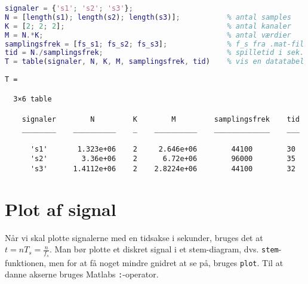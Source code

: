 \documentclass[a4paper]{report}
\begin{document}
\begin{lstlisting}[language=Matlab, style=Matlab-editor]
signaler = {'s1'; 's2'; 's3'};
N = [length(s1); length(s2); length(s3)];           % antal samples
K = [2; 2; 2];                                      % antal kanaler
M = N.*K;                                           % antal værdier
samplingsfrek = [fs_s1; fs_s2; fs_s3];              % f_s fra .mat-fil
tid = N./samplingsfrek;                             % spilletid i sek.
T = table(signaler, N, K, M, samplingsfrek, tid)    % vis en datatabel
\end{lstlisting}

        \color{lightgray} \begin{verbatim}
T =

  3×6 table

    signaler        N         K        M         samplingsfrek    tid
    ________    __________    _    __________    _____________    ___

      's1'       1.323e+06    2     2.646e+06        44100        30 
      's2'        3.36e+06    2      6.72e+06        96000        35 
      's3'      1.4112e+06    2    2.8224e+06        44100        32 

\end{verbatim} \color{black}
    


\section{Plot af signal}

        \begin{par}

Når vi skal plotte signalerne med en tidsakse i sekunder, bruges det at
$t = n T_s = \frac{n}{f_s}$. Man bør plotte et diskret signal i et
stem-diagram, dvs. \texttt{stem}-funktionen, men for at få noget mindre
gnidret at se på, bruges \texttt{plot}. Til at danne akserne bruges
Matlabs \texttt{:}-operator.\\\\

\end{par} 
\end{document}
